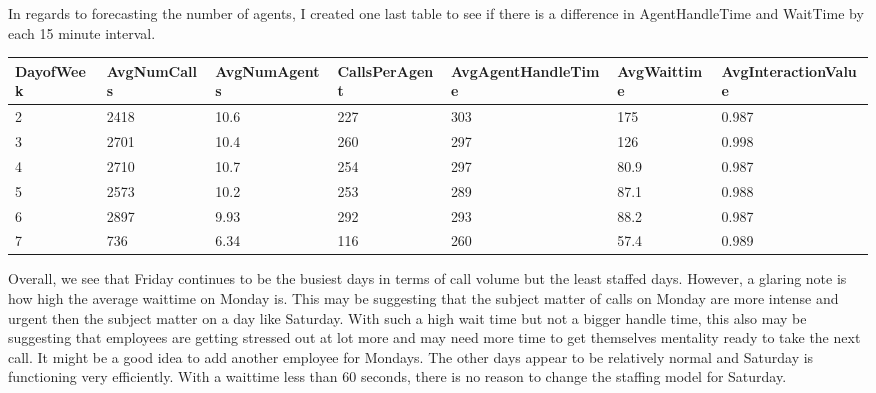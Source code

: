 \documentclass[12pt]{article}
\begin{document}
In regards to forecasting the number of agents, I created one last table to see if there is a difference in AgentHandleTime and WaitTime
by each 15 minute interval.
\begin{table}[H]
  \resizebox{\textwidth}{!} {
  \begin{tabular}{ l | l | l | l | l | l | l |}
    {\bf DayofWeek} & {\bf AvgNumCalls} & {\bf AvgNumAgents} & {\bf CallsPerAgent} & {\bf AvgAgentHandleTime} & {\bf AvgWaittime} & {\bf AvgInteractionValue}\\
  \hline
  2 & 2418 & 10.6 & 227 & 303 & 175 & 0.987 \\
  \hline
  3 & 2701 & 10.4 & 260 & 297 & 126 & 0.998\\
  \hline
  4 & 2710 & 10.7 & 254 & 297 & 80.9 & 0.987 \\
  \hline
  5 & 2573 & 10.2 & 253 & 289 & 87.1 & 0.988 \\
  \hline
  6 & 2897 & 9.93 & 292 & 293 & 88.2 & 0.987 \\
  \hline
  7 & 736 & 6.34 & 116 & 260 & 57.4 & 0.989\\
  \end{tabular}
  }
  \end{table}
  Overall, we see that Friday continues to be the busiest days in terms of call volume but the least staffed days. However, a glaring note
is how high the average waittime on Monday is. This may be suggesting that the subject matter of calls on Monday are more intense and urgent
then the subject matter on a day like Saturday. With such a high wait time but not a bigger handle time, this also may be suggesting that
employees are getting stressed out at lot more and may need more time to get themselves mentality ready to take the next call. It might be a good idea to add another employee for Mondays. 
The other days appear to be relatively normal and Saturday is functioning very efficiently. With a waittime less than 60 seconds, there is no reason to change the staffing model for
Saturday. 
\end{document}
